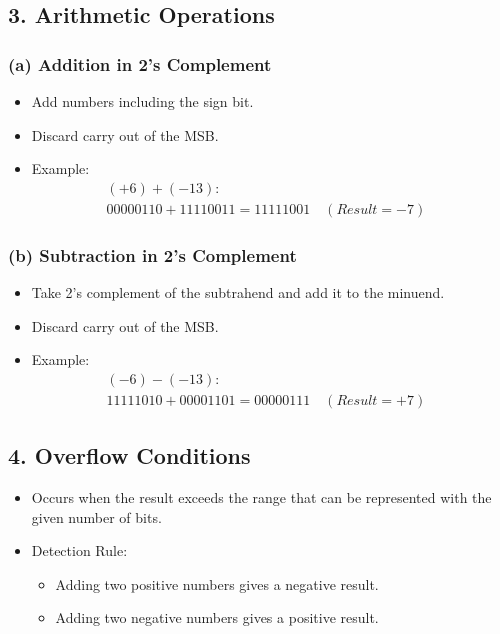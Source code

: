 \documentclass[a4paper,12pt]{article}
\begin{document}
\subsection*{3. Arithmetic Operations}

\subsubsection*{(a) Addition in 2's Complement}
\begin{itemize}
    \item Add numbers including the sign bit.
    \item Discard carry out of the MSB.
    \item Example:
    \begin{align*}
        (+6) + (-13): & \\
        00000110 + 11110011 = 11111001 \quad (Result = -7)
    \end{align*}
\end{itemize}

\subsubsection*{(b) Subtraction in 2's Complement}
\begin{itemize}
    \item Take 2's complement of the subtrahend and add it to the minuend.
    \item Discard carry out of the MSB.
    \item Example:
    \begin{align*}
        (-6) - (-13): & \\
        11111010 + 00001101 = 00000111 \quad (Result = +7)
    \end{align*}
\end{itemize}

\subsection*{4. Overflow Conditions}
\begin{itemize}
    \item Occurs when the result exceeds the range that can be represented with the given number of bits.
    \item Detection Rule:
    \begin{itemize}
        \item Adding two positive numbers gives a negative result.
        \item Adding two negative numbers gives a positive result.
    \end{itemize}
\end{itemize}
\end{document}
